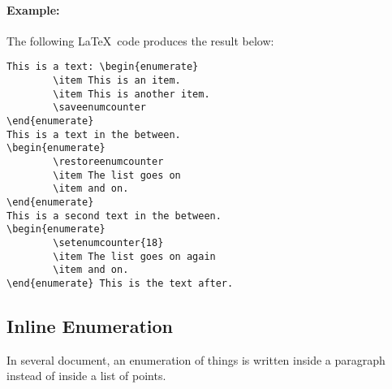\documentclass[book]{upmethodology-document}
\begin{document}
\paragraph{Example:} The following \LaTeX~code produces the result below:
\begin{verbatim}
This is a text: \begin{enumerate}
        \item This is an item.
        \item This is another item.
        \saveenumcounter
\end{enumerate}
This is a text in the between.
\begin{enumerate}
        \restoreenumcounter
        \item The list goes on
        \item and on.
\end{enumerate}
This is a second text in the between.
\begin{enumerate}
        \setenumcounter{18}
        \item The list goes on again
        \item and on.
\end{enumerate} This is the text after.
\end{verbatim}


\subsection{Inline Enumeration}

In several document, an enumeration of things is written inside a paragraph instead of inside a list of points.
\end{document}
